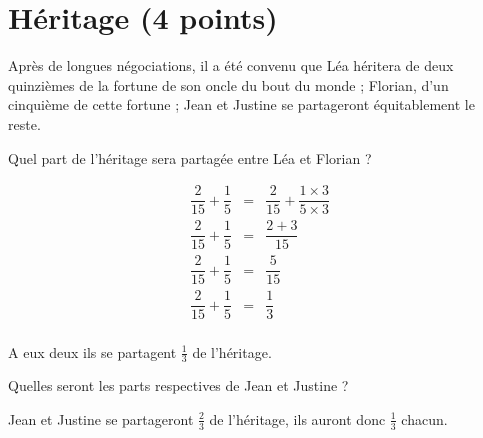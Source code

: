 \section{Héritage (4 points)}

Après de longues négociations, il a été convenu que Léa héritera de deux quinzièmes de la fortune de son oncle du bout du monde ; Florian, d'un cinquième de cette fortune ; Jean et Justine se partageront équitablement le reste.

\begin{questions}
	\question[2] Quel part de l'héritage sera partagée entre Léa et Florian ?
	\begin{solution}
		\begin{eqnarray*}
			\dfrac{2}{15} + \dfrac{1}{5} &=& \dfrac{2}{15} + \dfrac{1 \times 3}{5 \times 3} \\
			\dfrac{2}{15} + \dfrac{1}{5} &=& \dfrac{2 + 3}{15} \\
			\dfrac{2}{15} + \dfrac{1}{5} &=& \dfrac{5}{15} \\
			\dfrac{2}{15} + \dfrac{1}{5} &=& \dfrac{1}{3} \\
		\end{eqnarray*}
	
	A eux deux ils se partagent $\frac{1}{3}$ de l'héritage.
	\end{solution}

	\question[2] Quelles seront les parts respectives de Jean et Justine ?
	
	\begin{solution}
		Jean et Justine se partageront $\frac{2}{3}$ de l'héritage, ils auront donc $\frac{1}{3}$ chacun.
	\end{solution}
\end{questions}

